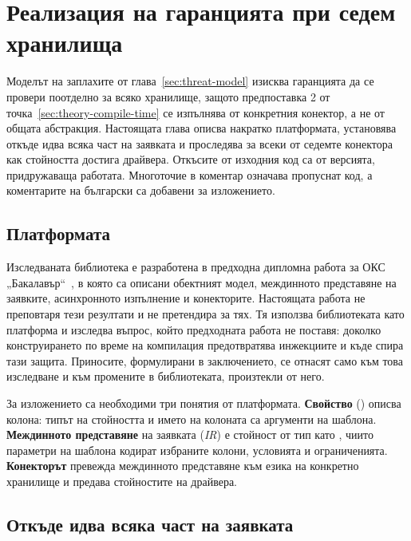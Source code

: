 \section{Реализация на гаранцията при седем хранилища}
\label{sec:enforcement}

Моделът на заплахите от глава~\ref{sec:threat-model} изисква гаранцията да се
провери поотделно за всяко хранилище, защото предпоставка 2 от
точка~\ref{sec:theory-compile-time} се изпълнява от конкретния конектор, а не от
общата абстракция. Настоящата глава описва накратко платформата, установява
откъде идва всяка част на заявката и проследява за всеки от седемте конектора как
стойността достига драйвера. Откъсите от изходния код са от версията, придружаваща работата. Многоточие в коментар
означава пропуснат код, а коментарите на български са добавени за изложението.

\subsection{Платформата}
\label{sec:enf-platform}

Изследваната библиотека е разработена в предходна дипломна работа за ОКС
„Бакалавър“~\cite{tsvetanov2026orm}, в която са описани обектният модел,
междинното представяне на заявките, асинхронното изпълнение и конекторите.
Настоящата работа не преповтаря тези резултати и не претендира за тях. Тя
използва библиотеката като платформа и изследва въпрос, който предходната работа
не поставя: доколко конструирането по време на компилация предотвратява
инжекциите и къде спира тази защита. Приносите, формулирани в заключението, се
отнасят само към това изследване и към промените в библиотеката, произтекли от
него.

За изложението са необходими три понятия от платформата. \textbf{Свойство}
() описва колона: типът на стойността и името на
колоната са аргументи на шаблона. \textbf{Междинното представяне} на заявката
(\textit{IR}) е стойност от тип като , чиито параметри на
шаблона кодират избраните колони, условията и ограниченията. \textbf{Конекторът}
превежда междинното представяне към езика на конкретно хранилище и предава
стойностите на драйвера.

\subsection{Откъде идва всяка част на заявката}
\label{sec:enf-origin}

